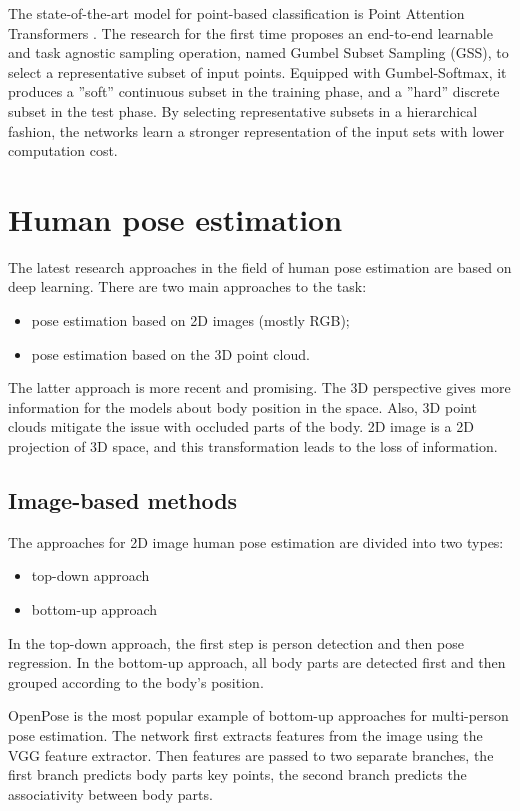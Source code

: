 The state-of-the-art model for point-based classification is Point Attention Transformers \parencite{yang_modeling_2019}. The research for the first time proposes an end-to-end learnable and task agnostic sampling operation, named Gumbel Subset Sampling (GSS), to select a representative subset of input points. Equipped with Gumbel-Softmax, it produces a ”soft” continuous subset in the training phase, and a ”hard” discrete subset in the test phase. By selecting representative subsets in a hierarchical fashion, the networks learn a stronger representation of the input sets with lower computation cost.

\section{Human pose estimation}
\label{Human pose estimation}
The latest research approaches in the field of human pose estimation are based on deep learning.
There are two main approaches to the task:
\begin{itemize}
  \item pose estimation based on 2D images (mostly RGB);
  \item pose estimation based on the 3D point cloud.
\end{itemize}

The latter approach is more recent and promising. The 3D perspective gives more information for the models about body position in the space. Also, 3D point clouds mitigate the issue with occluded parts of the body. 2D image is a 2D projection of 3D space, and this transformation leads to the loss of information.

\subsection{Image-based methods}
The approaches for 2D image human pose estimation are divided into two types:
\begin{itemize}
  \item top-down approach
  \item bottom-up approach
\end{itemize}
In the top-down approach, the first step is person detection and then pose regression. In the bottom-up approach, all body parts are detected first and then grouped according to the body's position.

OpenPose \parencite{cao_openpose_2019} is the most popular example of bottom-up approaches for multi-person pose estimation. The network first extracts features from the image using the VGG feature extractor. Then features are passed to two separate branches, the first branch predicts body parts key points, the second branch predicts the associativity between body parts.

